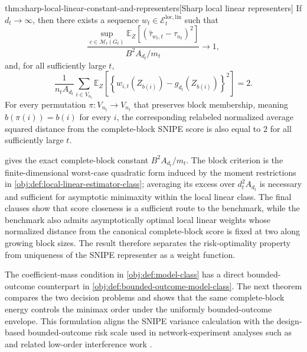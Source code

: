 \begin{theoremv}{thm:sharp-local-linear-constant-and-representers}[Sharp local linear representers]
If \(d_t\to\infty\), then there exists a sequence \(w_t\in\mathcal E_t^{\mathrm{loc,lin}}\) such that
\[
\frac{
\sup_{c\in\mathcal M_t(G_t)}
\mathbb E_Z\!\left[(\widehat\tau_{w_t,t}-\tau_{n_t})^2\right]
}{
B^2A_{d_t}/m_t
}
\longrightarrow 1,
\]
and, for all sufficiently large \(t\),
\[
\frac{1}{n_tA_{d_t}}
\sum_{i\in V_{n_t}}
\mathbb E_Z\!\left[
\left\{
w_{i,t}(Z_{b(i)})-g_{d_t}(Z_{b(i)})
\right\}^2
\right]
=2.
\]
For every permutation \(\pi:V_{n_t}\to V_{n_t}\) that preserves block membership, meaning \(b(\pi(i))=b(i)\) for every \(i\), the corresponding relabeled normalized average squared distance from the complete-block SNIPE score is also equal to \(2\) for all sufficiently large \(t\).
\end{theoremv}

 gives the exact complete-block constant \(B^2A_{d_t}/m_t\). The block criterion  is the finite-dimensional worst-case quadratic form induced by the moment restrictions in \cref{obj:def:local-linear-estimator-class}; averaging its excess over \(d_t^2A_{d_t}\) is necessary and sufficient for asymptotic minimaxity within the local linear class. The final clauses show that score closeness is a sufficient route to the benchmark, while the benchmark also admits asymptotically optimal local linear weights whose normalized distance from the canonical complete-block score is fixed at two along growing block sizes. The result therefore separates the risk-optimality property from uniqueness of the SNIPE representer as a weight function.

The coefficient-mass condition in \cref{obj:def:model-class} has a direct bounded-outcome counterpart in \cref{obj:def:bounded-outcome-model-class}. The next theorem compares the two decision problems and shows that the same complete-block energy controls the minimax order under the uniformly bounded-outcome envelope. This formulation aligns the SNIPE variance calculation with the design-based bounded-outcome risk scale used in network-experiment analyses such as \citet{CortezRodriguezEichhornYu2023} and related low-order interference work \citep{HarshawSavjeWang2025,WangLi2026}.


